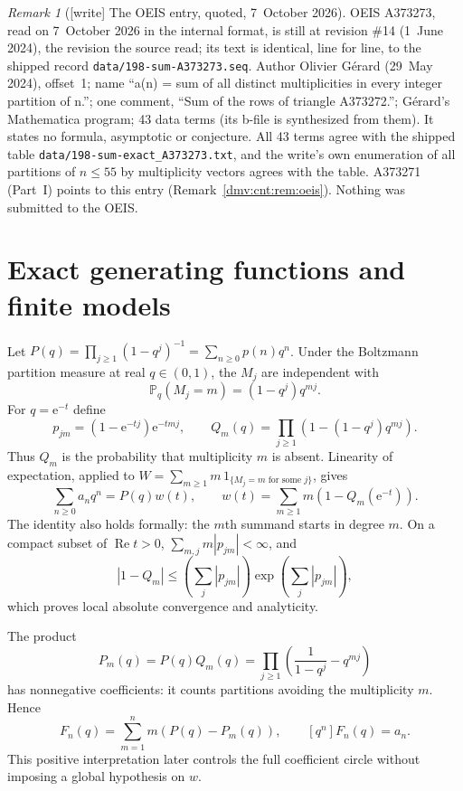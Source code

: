 \documentclass[11pt,letterpaper]{article}
\numberwithin{equation}{section}
\theoremstyle{definition}\newtheorem{definition}[theorem]{Definition}
\theoremstyle{remark}\newtheorem{remark}[theorem]{Remark}
\newcommand{\Prob}{\mathbb P}
\newcommand{\ee}{\mathrm e}
\DeclareMathOperator{\Rea}{Re}
\newcommand{\file}[1]{\nolinkurl{#1}}
\begin{document}
\begin{remark}[{[write]} The OEIS entry, quoted, 7~October 2026]\label{dmv:sum:rem:oeis}
OEIS A373273, read on 7~October 2026 in the internal format, is still at
revision \#14 (1~June 2024), the revision the source read; its text is
identical, line for line, to the shipped record
\file{data/198-sum-A373273.seq}. Author Olivier G\'erard (29~May 2024),
offset~1; name ``a(n) = sum of all distinct multiplicities in every integer
partition of n.''; one comment, ``Sum of the rows of triangle A373272.'';
G\'erard's Mathematica program; 43 data terms (its b-file is synthesized from
them). It states no formula, asymptotic or conjecture. All 43 terms agree
with the shipped table \file{data/198-sum-exact_A373273.txt}, and the
write's own enumeration of all partitions of $n\le55$ by multiplicity vectors
agrees with the table. A373271 (Part~I) points to this entry
(Remark~\ref{dmv:cnt:rem:oeis}). Nothing was submitted to the OEIS.
\end{remark}

\section{Exact generating functions and finite models}\label{dmv:sum:sec:model}
Let $P(q)=\prod_{j\ge1}(1-q^j)^{-1}=\sum_{n\ge0}p(n)q^n$. Under the Boltzmann partition measure at real $q\in(0,1)$, the $M_j$ are independent with
\begin{equation}
 \Prob_q(M_j=m)=(1-q^j)q^{mj}.
\end{equation}
For $q=\ee^{-t}$ define
\begin{equation}\label{dmv:sum:eq:Q}
 p_{jm}=(1-\ee^{-tj})\ee^{-tmj},\qquad
 Q_m(q)=\prod_{j\ge1}(1-(1-q^j)q^{mj}).
\end{equation}
Thus $Q_m$ is the probability that multiplicity $m$ is absent. Linearity of expectation, applied to $W=\sum_{m\ge1}m\,1_{\{M_j=m\text{ for some }j\}}$, gives
\begin{equation}\label{dmv:sum:eq:gf}
 \sum_{n\ge0}a_nq^n=P(q)w(t),\qquad w(t)=\sum_{m\ge1}m(1-Q_m(\ee^{-t})).
\end{equation}
The identity also holds formally: the $m$th summand starts in degree $m$. On a compact subset of $\Rea t>0$, $\sum_{m,j}m|p_{jm}|<\infty$, and
\[
 |1-Q_m|\le\left(\sum_j|p_{jm}|\right)\exp\left(\sum_j|p_{jm}|\right),
\]
which proves local absolute convergence and analyticity.

The product
\begin{equation}\label{dmv:sum:eq:avoid}
 P_m(q)=P(q)Q_m(q)=\prod_{j\ge1}\left(\frac1{1-q^j}-q^{mj}\right)
\end{equation}
has nonnegative coefficients: it counts partitions avoiding the multiplicity $m$. Hence
\begin{equation}\label{dmv:sum:eq:finite}
 F_n(q)=\sum_{m=1}^n m(P(q)-P_m(q)),\qquad [q^n]F_n(q)=a_n.
\end{equation}
This positive interpretation later controls the full coefficient circle without imposing a global hypothesis on $w$.
\end{document}
